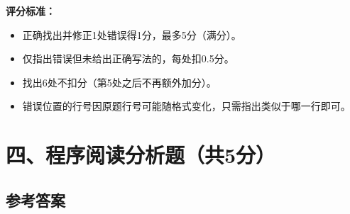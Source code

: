\noindent\textbf{评分标准：}
\begin{itemize}
  \item 正确找出并修正1处错误得1分，最多5分（满分）。
  \item 仅指出错误但未给出正确写法的，每处扣0.5分。
  \item 找出6处不扣分（第5处之后不再额外加分）。
  \item 错误位置的行号因原题行号可能随格式变化，只需指出类似于哪一行即可。
\end{itemize}

\newpage
\section{四、程序阅读分析题（共5分）}

\subsection*{参考答案}

